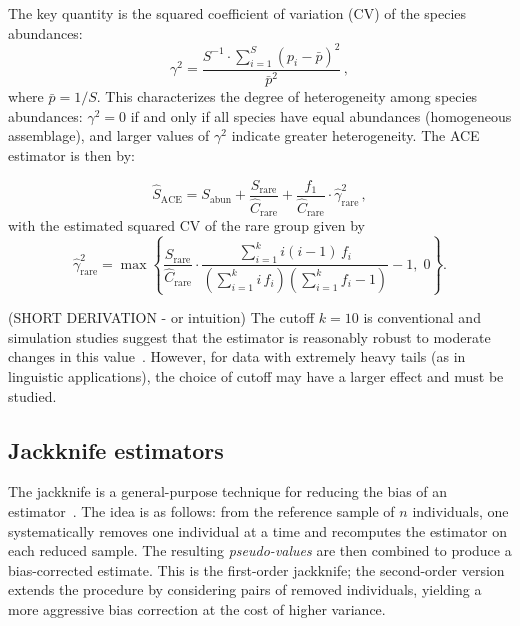 \documentclass{article}
\begin{document}
{The key quantity is the squared coefficient of variation (CV) of the species abundances:
\begin{equation}\label{eq:cv}
    \gamma^2 = \frac{S^{-1} \cdot \sum_{i=1}^{S} (p_i - \bar{p})^2}
    {\bar{p}^2}\,,
\end{equation}
where $\bar{p} = 1/S$. This characterizes the degree of heterogeneity among species abundances: $\gamma^2 = 0$ if and only if all species have equal abundances (homogeneous assemblage), and larger values of $\gamma^2$ indicate greater heterogeneity. The ACE estimator is then by:

\begin{equation}\label{eq:ace}
    \hat{S}_{\mathrm{ACE}} = S_{\mathrm{abun}} 
    + \frac{S_{\mathrm{rare}}}{\hat{C}_{\mathrm{rare}}} 
    + \frac{f_1}{\hat{C}_{\mathrm{rare}}} \cdot 
    \hat{\gamma}^2_{\mathrm{rare}}\,,
\end{equation}
with the estimated squared CV of the rare group given by
\begin{equation}\label{eq:cv_rare}
    \hat{\gamma}^2_{\mathrm{rare}} = \max\!\left\{
    \frac{S_{\mathrm{rare}}}{\hat{C}_{\mathrm{rare}}}
    \cdot
    \frac{\sum_{i=1}^{k} i(i-1)\, f_i}
    {\left(\sum_{i=1}^{k} i\, f_i\right)
     \left(\sum_{i=1}^{k} f_i - 1\right)}
    - 1,\; 0 \right\}.
\end{equation}

(SHORT DERIVATION - or intuition)
The cutoff $k = 10$ is conventional and simulation studies suggest that the estimator is reasonably robust to moderate changes in this value~\cite{chaolee1992}. However, for data with extremely heavy tails (as in linguistic applications), the choice of cutoff may have a larger effect and must be studied.

\subsection{Jackknife estimators}
The jackknife is a general-purpose technique for reducing the bias of an estimator~\cite{burnham1978,burnham1979}. The idea is as follows: from the reference sample of $n$ individuals, one systematically removes one individual at a time and recomputes the estimator on each reduced sample. The resulting \emph{pseudo-values} are then combined to produce a bias-corrected estimate. This is the first-order jackknife; 
the second-order version extends the procedure by considering pairs of removed individuals, yielding a more aggressive bias correction at the cost of higher variance.
 
}
\end{document}
